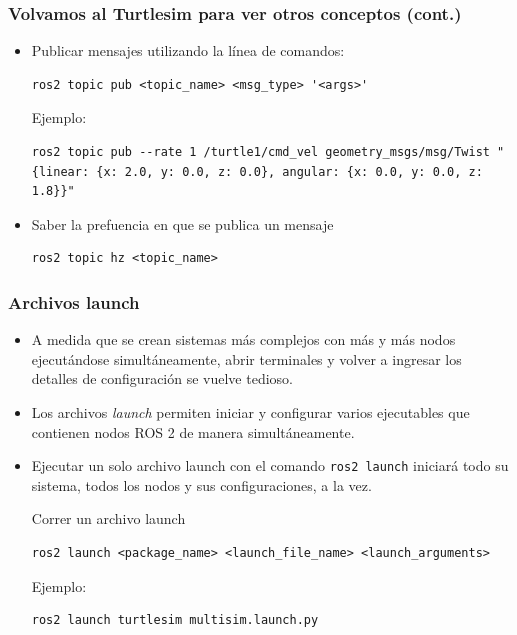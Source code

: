 \begin{frame}[fragile]
	\frametitle{Volvamos al Turtlesim para ver otros conceptos (cont.)}
    \begin{itemize}
        \item Publicar mensajes utilizando la línea de comandos:

\begin{lstlisting}[style=bash]  
ros2 topic pub <topic_name> <msg_type> '<args>'
\end{lstlisting}    

Ejemplo:

\begin{lstlisting}[style=bash,basicstyle=\tiny]  
ros2 topic pub --rate 1 /turtle1/cmd_vel geometry_msgs/msg/Twist "{linear: {x: 2.0, y: 0.0, z: 0.0}, angular: {x: 0.0, y: 0.0, z: 1.8}}"
\end{lstlisting}    

\item Saber la prefuencia en que se publica un mensaje

\begin{lstlisting}[style=bash]  
ros2 topic hz <topic_name>
\end{lstlisting}
    \end{itemize}
\end{frame}

\begin{frame}[fragile]
	\frametitle{Archivos launch}
	
    \begin{itemize}
        \item A medida que se crean sistemas más complejos con más y más nodos ejecutándose simultáneamente, abrir terminales y volver a ingresar los detalles de configuración se vuelve tedioso.

        \item Los archivos \emph{launch} permiten iniciar y configurar varios ejecutables que contienen nodos ROS 2 de manera simultáneamente.

        \item Ejecutar un solo archivo launch con el comando \lstinline[style=bash]{ros2 launch} iniciará todo su sistema, todos los nodos y sus configuraciones, a la vez.

Correr un archivo launch
\begin{lstlisting}[style=bash] 
ros2 launch <package_name> <launch_file_name> <launch_arguments>
\end{lstlisting}

Ejemplo:
\begin{lstlisting}[style=bash] 
ros2 launch turtlesim multisim.launch.py
\end{lstlisting}

    \end{itemize}
\end{frame}


